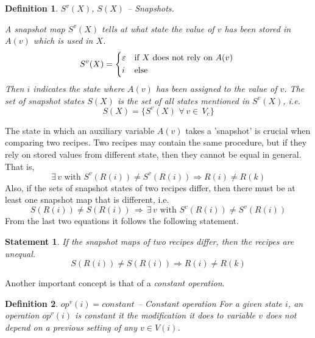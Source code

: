 \documentclass[12pt,a4paper]{scrartcl}
\newtheorem{definition}{Definition}
\newtheorem{statement}{Statement}
\begin{document}
\begin{definition} $S^v(X)$, $S(X)$ -- Snapshots.

    A \textit{snapshot map} $S^v(X)$ tells at what state the value of $v$ has
    been stored in $A(v)$ which is used in $X$. 
    \begin{equation}
        S^v(X) = \begin{dcases*}
                   \varepsilon & if $X$ does not rely on $A(v)$ \\
                   i           & else
                 \end{dcases*}
    \end{equation}
    Then $i$ indicates the state where $A(v)$ has been assigned to the value of $v$.
    The \textit{set of snapshot states} $S(X)$ is the set of all states mentioned in
    $S^v(X)$, i.e.
    \begin{equation}
        \label{eq:snapshot-map-1}
        S(X) = \{ S^v(X) \,\,\forall\,v\in\,V_c\}
    \end{equation}

\end{definition}
The state in which an auxiliary variable $A(v)$ takes a 'snapshot' is crucial when
comparing two recipes. Two recipes may contain the same procedure, but if they rely on
stored values from different state, then they cannot be equal in general. That is, 
\begin{equation} \label{eq:snapshot-map-difference}
   \exists\,v\,\,\mbox{with}\,\,S^v(R(i)) \neq S^v(R(i)) \Rightarrow R(i) \neq R(k)
\end{equation}
Also, if the sets of snapshot states of two recipes differ, then there must be 
at least one snapshot map that is different, i.e.
\begin{equation} \label{eq:snapshot-map-difference-2b}
   S(R(i)) \neq S(R(i)) \,\Rightarrow\,\exists\,v\,\,\mbox{with}\,\,S^v(R(i)) \neq S^v(R(i)) 
\end{equation}
From the last two equations it follows the following statement.
\begin{statement}
   If the snapshot maps of two recipes differ, then the recipes are unequal. 
   \begin{equation} \label{eq:snapshot-map-difference3}
       S(R(i)) \neq S(R(i)) \Rightarrow R(i) \neq R(k)
   \end{equation}
\end{statement}
Another important concept is that of a \textit{constant operation}.
\begin{definition} $op^v(i) = constant$ -- Constant operation
    For a given state $i$, an operation $op^v(i)$ is constant it the
    modification it does to variable $v$ does not depend on a previous setting
    of any $v\in V(i)$. 
\end{definition}
\end{document}
